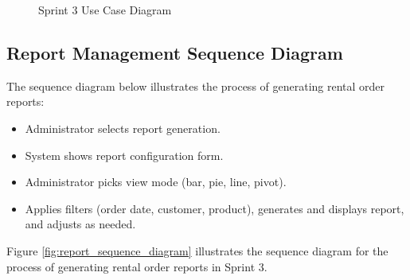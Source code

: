 \begin{figure}[h]
    \centering
    \caption{Sprint 3 Use Case Diagram}
    \label{fig:sprint3_use_case_diagram}
\end{figure}

\subsection{Report Management Sequence Diagram}
The sequence diagram below illustrates the process of generating rental order reports:

\begin{itemize}
    \item Administrator selects report generation.
    \item System shows report configuration form.
    \item Administrator picks view mode (bar, pie, line, pivot).
    \item Applies filters (order date, customer, product), generates and displays report, and adjusts as needed.
\end{itemize}
Figure \ref{fig:report_sequence_diagram} illustrates the sequence diagram for the process of generating rental order reports in Sprint 3.

